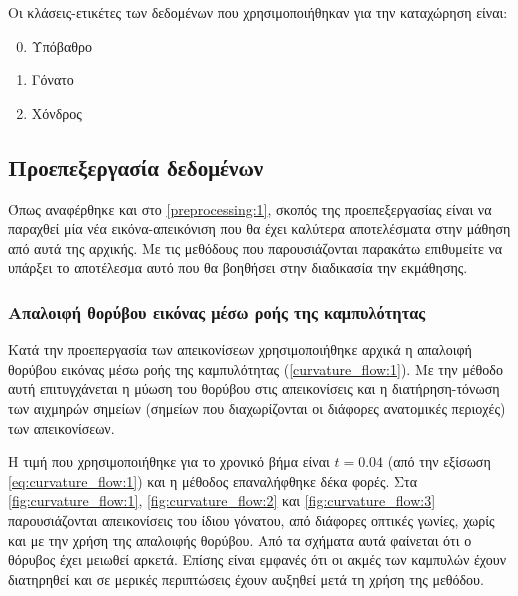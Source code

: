 \documentclass[a4paper,12pt]{article}
\begin{document}
Οι κλάσεις-ετικέτες των δεδομένων που χρησιμοποιήθηκαν για την καταχώρηση είναι:

\begin{enumerate}
    \setcounter{enumi}{-1} 
    \item Υπόβαθρο
    \item Γόνατο
    \item Χόνδρος
\end{enumerate}

\subsection{Προεπεξεργασία δεδομένων}

Όπως αναφέρθηκε και στο \ref{preprocessing:1}, σκοπός της προεπεξεργασίας είναι
να παραχθεί μία νέα εικόνα-απεικόνιση που θα έχει καλύτερα αποτελέσματα στην
μάθηση από αυτά της αρχικής. Με τις μεθόδους που παρουσιάζονται παρακάτω
επιθυμείτε να υπάρξει το αποτέλεσμα αυτό που θα βοηθήσει στην διαδικασία την
εκμάθησης.

\subsubsection{Απαλοιφή θορύβου εικόνας μέσω ροής της καμπυλότητας}

Κατά την προεπεργασία των απεικονίσεων χρησιμοποιήθηκε αρχικά η απαλοιφή θορύβου
εικόνας μέσω ροής της καμπυλότητας (\ref{curvature_flow:1}). Με την μέθοδο αυτή
επιτυγχάνεται η μύωση του θορύβου στις απεικονίσεις και η διατήρηση-τόνωση των
αιχμηρών σημείων (σημείων που διαχωρίζονται οι διάφορες ανατομικές περιοχές) των
απεικονίσεων.

Η τιμή που χρησιμοποιήθηκε για το χρονικό βήμα είναι $t=0.04$ (από την εξίσωση
\eqref{eq:curvature_flow:1}) και η μέθοδος επαναλήφθηκε δέκα φορές.  Στα
\autoref{fig:curvature_flow:1}, \autoref{fig:curvature_flow:2} και
\autoref{fig:curvature_flow:3} παρουσιάζονται απεικονίσεις του ίδιου γόνατου,
από διάφορες οπτικές γωνίες, χωρίς και με την χρήση της απαλοιφής θορύβου. Από
τα σχήματα αυτά φαίνεται ότι ο θόρυβος έχει μειωθεί αρκετά. Επίσης είναι εμφανές
ότι οι ακμές των καμπυλών έχουν διατηρηθεί και σε μερικές περιπτώσεις έχουν
αυξηθεί μετά τη χρήση της μεθόδου.
\end{document}

